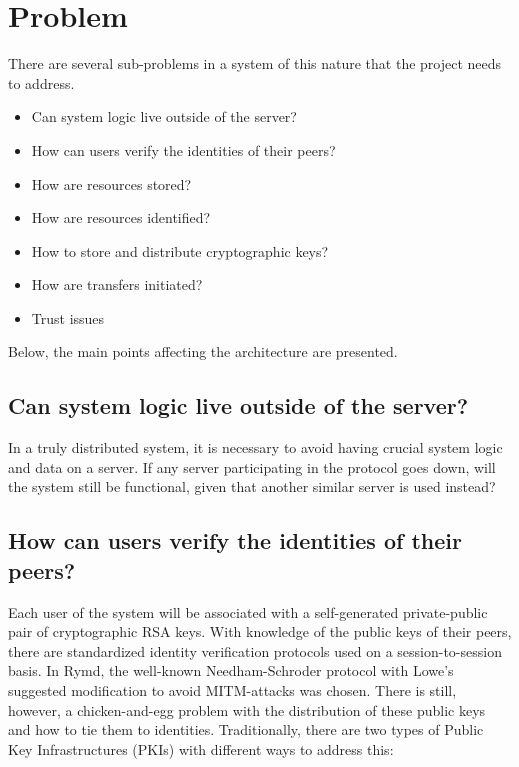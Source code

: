 \section{Problem}
There are several sub-problems in a system of this nature that the project needs to address.

\begin{itemize}
\item Can system logic live outside of the server?
\item How can users verify the identities of their peers?
\item How are resources stored?
\item How are resources identified?
\item How to store and distribute cryptographic keys?
\item How are transfers initiated?
\item Trust issues
\end{itemize}

Below, the main points affecting the architecture are presented.

\subsection{Can system logic live outside of the server?}
In a truly distributed system, it is necessary to avoid having crucial system logic and data on a server. If any server participating in the protocol goes down, will the system still be functional, given that another similar server is used instead?

\subsection{How can users verify the identities of their peers?}
Each user of the system will be associated with a self-generated private-public pair of cryptographic RSA keys. With knowledge of the public keys of their peers, there are standardized identity verification protocols used on a session-to-session basis. In Rymd, the well-known Needham-Schroder protocol with Lowe's suggested modification to avoid MITM-attacks was chosen. There is still, however, a chicken-and-egg problem with the distribution of these public keys and how to tie them to identities. Traditionally, there are two types of Public Key Infrastructures (PKIs) with different ways to address this:

